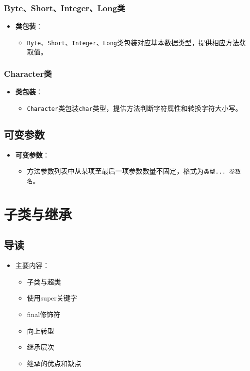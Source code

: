 \documentclass[a4paper, 10pt]{ctexart}
\begin{document}
\subsubsection{Byte、Short、Integer、Long类}
\begin{itemize}
  \item \textbf{类包装}：
  \begin{itemize}
    \item \texttt{Byte}、\texttt{Short}、\texttt{Integer}、\texttt{Long}类包装对应基本数据类型，提供相应方法获取值。
  \end{itemize}
\end{itemize}

\subsubsection{Character类}
\begin{itemize}
  \item \textbf{类包装}：
  \begin{itemize}
    \item \texttt{Character}类包装\texttt{char}类型，提供方法判断字符属性和转换字符大小写。
  \end{itemize}
\end{itemize}

\subsection{可变参数}
\begin{itemize}
  \item \textbf{可变参数}：
  \begin{itemize}
    \item 方法参数列表中从某项至最后一项参数数量不固定，格式为\texttt{类型... 参数名}。
  \end{itemize}
\end{itemize}

\section{子类与继承}

\subsection{导读}
\begin{itemize}
  \item 主要内容：
  \begin{itemize}
    \item 子类与超类
    \item 使用super关键字
    \item final修饰符
    \item 向上转型
    \item 继承层次
    \item 继承的优点和缺点
  \end{itemize}
\end{itemize}
\end{document}
